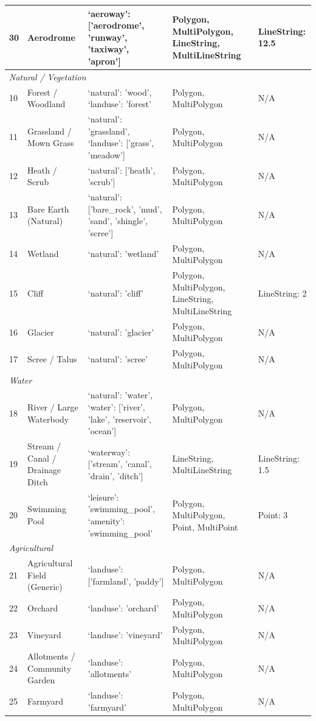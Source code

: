 \documentclass{report}
\begin{document}
\begin{longtable}{@{}p{} p{} p{} p{} p{}@{}}
30 & Aerodrome & `aeroway': ['aerodrome', 'runway', 'taxiway', 'apron'] & Polygon, MultiPolygon, LineString, MultiLineString & LineString: 12.5 \\
\midrule
\multicolumn{5}{l}{\textit{Natural / Vegetation}} \\
\midrule
10 & Forest / Woodland & `natural': 'wood', `landuse': 'forest' & Polygon, MultiPolygon & N/A \\
11 & Grassland / Mown Grass & `natural': 'grassland', `landuse': ['grass', 'meadow'] & Polygon, MultiPolygon & N/A \\
12 & Heath / Scrub & `natural': ['heath', 'scrub'] & Polygon, MultiPolygon & N/A \\
13 & Bare Earth (Natural) & `natural': ['bare\_rock', 'mud', 'sand', 'shingle', 'scree'] & Polygon, MultiPolygon & N/A \\
14 & Wetland & `natural': 'wetland' & Polygon, MultiPolygon & N/A \\
15 & Cliff & `natural': 'cliff' & Polygon, MultiPolygon, LineString, MultiLineString & LineString: 2 \\
16 & Glacier & `natural': 'glacier' & Polygon, MultiPolygon & N/A \\
17 & Scree / Talus & `natural': 'scree' & Polygon, MultiPolygon & N/A \\
\midrule
\multicolumn{5}{l}{\textit{Water}} \\
\midrule
18 & River / Large Waterbody & `natural': 'water', `water': ['river', 'lake', 'reservoir', 'ocean'] & Polygon, MultiPolygon & N/A \\
19 & Stream / Canal / Drainage Ditch & `waterway': ['stream', 'canal', 'drain', 'ditch'] & LineString, MultiLineString & LineString: 1.5 \\
20 & Swimming Pool & `leisure': 'swimming\_pool', `amenity': 'swimming\_pool' & Polygon, MultiPolygon, Point, MultiPoint & Point: 3 \\
\midrule
\multicolumn{5}{l}{\textit{Agricultural}} \\
\midrule
21 & Agricultural Field (Generic) & `landuse': ['farmland', 'paddy'] & Polygon, MultiPolygon & N/A \\
22 & Orchard & `landuse': 'orchard' & Polygon, MultiPolygon & N/A \\
23 & Vineyard & `landuse': 'vineyard' & Polygon, MultiPolygon & N/A \\
24 & Allotments / Community Garden & `landuse': 'allotments' & Polygon, MultiPolygon & N/A \\
25 & Farmyard & `landuse': 'farmyard' & Polygon, MultiPolygon & N/A \\

\end{longtable}
\end{document}
